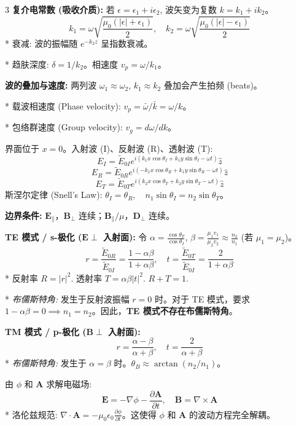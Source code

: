 \documentclass[10pt,a4paper,landscape,utf8]{ctexart}
\newcommand{\p}{\partial}
\newcommand{\bs}[1]{\boldsymbol{#1}}
\begin{document}
\begin{multicols*}{3}
\textbf{复介电常数 (吸收介质):}
若 $\epsilon = \epsilon_1 + i\epsilon_2$, 波矢变为复数 $k = k_1 + ik_2$。
$$ k_{1} = \omega\sqrt{\frac{\mu_0(|\epsilon|+\epsilon_1)}{2}}, \quad k_{2} = \omega\sqrt{\frac{\mu_0(|\epsilon|-\epsilon_1)}{2}} $$
* 衰减: 波的振幅随 $e^{-k_2 z}$ 呈指数衰减。

* 趋肤深度: $\delta = 1/k_2$。相速度 $v_p = \omega/k_1$。

\textbf{波的叠加与速度:}
两列波 $\omega_1 \approx \omega_2$, $k_1 \approx k_2$ 叠加会产生拍频 (beats)。

* 载波相速度 (Phase velocity): $v_p = \bar{\omega}/\bar{k} = \omega/k$。

* 包络群速度 (Group velocity): $v_g = d\omega/dk$。


界面位于 $x=0$。入射波 (I)、反射波 (R)、透射波 (T):
$$E_I = \tilde{E}_{0I} e^{i(k_{1}x\cos \theta_I + k_{1}y\sin \theta_I - \omega t)}\hat{z}$$
$$E_R = \tilde{E}_{0R} e^{i(-k_{1}x\cos \theta_R + k_{1}y\sin \theta_R - \omega t)}\hat{z}$$
$$E_T = \tilde{E}_{0T} e^{i(k_{2}x\cos \theta_T + k_{2}y\sin \theta_T - \omega t)}\hat{z}$$
斯涅尔定律 (Snell's Law): $\theta_I = \theta_R, \quad n_1\sin\theta_I = n_2\sin\theta_T$。

\textbf{边界条件:}
$\bs{E}_{\parallel}$，$\bs{B}_{\perp}$ 连续；$\bs{B}_{\parallel}/\mu$，$\bs{D}_{\perp}$ 连续。

\textbf{TE 模式 / s-极化 ($\bs{E} \perp$ 入射面):}
令 $\alpha = \frac{\cos\theta_T}{\cos\theta_I}$, $\beta = \frac{\mu_1 v_1}{\mu_2 v_2} \approx \frac{n_2}{n_1}$ (若 $\mu_1=\mu_2$)。
$$ r = \frac{\tilde{E}_{0R}}{\tilde{E}_{0I}} = \frac{1 - \alpha\beta}{1 + \alpha\beta}, \quad t = \frac{\tilde{E}_{0T}}{\tilde{E}_{0I}} = \frac{2}{1 + \alpha\beta} $$
* 反射率 $R = |r|^2$. 透射率 $T = \alpha\beta |t|^2$. $R+T=1$.

* \textit{布儒斯特角:} 发生于反射波振幅 $r=0$ 时。对于 TE 模式，要求 $1-\alpha\beta=0 \implies n_1=n_2$。因此，\textbf{TE 模式不存在布儒斯特角}。

\textbf{TM 模式 / p-极化 ($\bs{B} \perp$ 入射面):}
$$ r = \frac{\alpha - \beta}{\alpha + \beta}, \quad t = \frac{2}{\alpha + \beta} $$
* \textit{布儒斯特角:} 发生于 $\alpha=\beta$ 时。$\theta_B \approx \arctan(n_2/n_1)$。


由 $\phi$ 和 $\bs{A}$ 求解电磁场:
$$ \bs{E} = -\nabla\phi - \frac{\p\bs{A}}{\p t}, \quad \bs{B} = \nabla \times \bs{A} $$
* 洛伦兹规范: $\nabla \cdot \bs{A} = -\mu_0\epsilon_0\frac{\p\phi}{\p t}$。这使得 $\phi$ 和 $\bs{A}$ 的波动方程完全解耦。


\end{multicols*}
\end{document}
